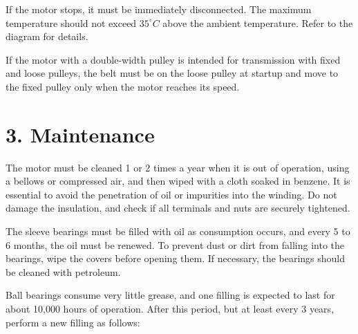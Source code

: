 If the motor stops, it must be immediately disconnected. The maximum temperature should not exceed \(35^\circ C\) above
the ambient temperature. Refer to the diagram for details.

If the motor with a double-width pulley is intended for transmission with fixed and loose pulleys,
the belt must be on the loose pulley at startup and move to the fixed pulley only when the motor reaches its speed.

\section*{3. Maintenance}

The motor must be cleaned 1 or 2 times a year when it is out of operation, using a bellows or compressed air,
and then wiped with a cloth soaked in benzene. It is essential to avoid the penetration of oil or impurities into the winding.
Do not damage the insulation, and check if all terminals and nuts are securely tightened.

The sleeve bearings must be filled with oil as consumption occurs, and every 5 to 6 months, the oil must be renewed.
To prevent dust or dirt from falling into the bearings, wipe the covers before opening them. If necessary,
the bearings should be cleaned with petroleum.

Ball bearings consume very little grease, and one filling is expected to last for about 10,000 hours of operation.
After this period, but at least every 3 years, perform a new filling as follows:

